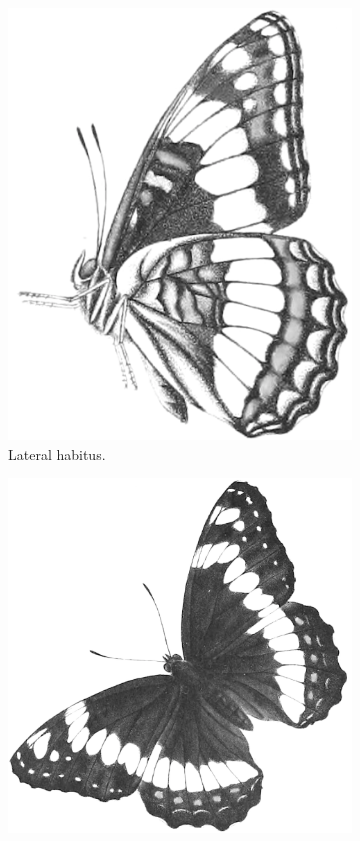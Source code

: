 \documentclass[letterpaper, 11pt]{article}
\begin{document}
\begin{figure}[ht!]
\begin{subfigure}[ht!]{0.30\textwidth}
        \includegraphics[width=\textwidth]{nymphalidLateral.png}
        \caption{Lateral habitus. \citep[Modified from Limenitis II in][]{bhlitem37427butt}}
        \label{fig:nymphalid2}
    \end{subfigure}
        \hfill %
    \begin{subfigure}[ht!]{0.38\textwidth}
        \includegraphics[width=\textwidth]{nymphalidDorsal.png}

\end{subfigure}
\end{figure}
\end{document}

